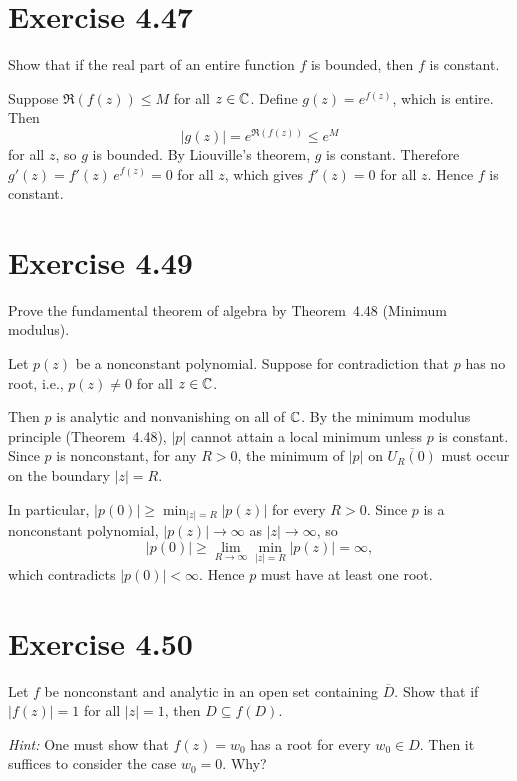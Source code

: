 \documentclass{article}
\begin{document}
\section{Exercise 4.47}

Show that if the real part of an entire function $f$ is bounded,
then $f$ is constant.

\begin{solution}
  Suppose $\Re(f(z)) \le M$ for all $z \in \mathbb{C}$. Define
  $g(z) = e^{f(z)}$, which is entire. Then
  \[
    |g(z)| = e^{\Re(f(z))} \le e^M
  \]
  for all $z$, so $g$ is bounded.
  By Liouville's theorem, $g$ is constant.
  Therefore $g'(z) = f'(z)\,e^{f(z)} = 0$ for all $z$,
  which gives $f'(z) = 0$ for all $z$. Hence $f$ is constant.
\end{solution}

\section{Exercise 4.49}

Prove the fundamental theorem of algebra by Theorem~4.48
(Minimum modulus).

\begin{solution}
  Let $p(z)$ be a nonconstant polynomial. Suppose for contradiction
  that $p$ has no root, i.e., $p(z) \ne 0$ for all $z \in \mathbb{C}$.

  Then $p$ is analytic and nonvanishing on all of $\mathbb{C}$.
  By the minimum modulus principle (Theorem~4.48),
  $|p|$ cannot attain a local minimum unless $p$ is constant.
  Since $p$ is nonconstant, for any $R > 0$, the minimum of $|p|$
  on $\overline{U_R(0)}$ must occur on the boundary $|z| = R$.

  In particular, $|p(0)| \ge \min_{|z|=R} |p(z)|$ for every $R > 0$.
  Since $p$ is a nonconstant polynomial, $|p(z)| \to \infty$
  as $|z| \to \infty$, so
  \[
    |p(0)| \ge \lim_{R \to \infty} \min_{|z|=R} |p(z)| = \infty,
  \]
  which contradicts $|p(0)| < \infty$.
  Hence $p$ must have at least one root.
\end{solution}

\section{Exercise 4.50}

Let $f$ be nonconstant and analytic in an open set containing
$\overline{D}$.  Show that if $|f(z)| = 1$ for all $|z| = 1$,
then $D \subseteq f(D)$.

\textit{Hint:} One must show that $f(z) = w_0$ has a root for
every $w_0 \in D$.  Then it suffices to consider the case
$w_0 = 0$.  Why?
\end{document}
